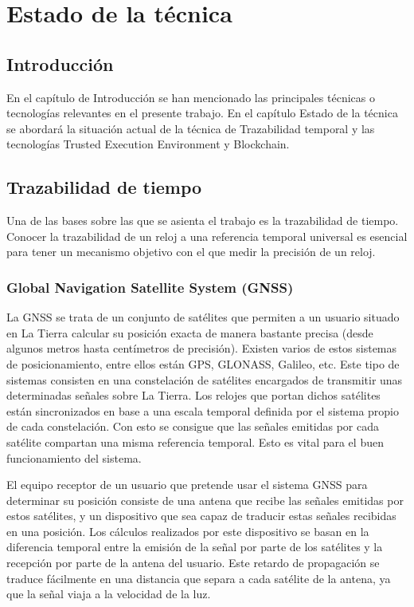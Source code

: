 \chapter{Estado de la técnica}

\section{Introducción}
En el capítulo de Introducción se han mencionado las principales técnicas o tecnologías relevantes en el presente trabajo. En el capítulo Estado de la técnica se abordará la situación actual de la técnica de Trazabilidad temporal y las tecnologías Trusted Execution Environment y Blockchain.

\section{Trazabilidad de tiempo}
Una de las bases sobre las que se asienta el trabajo es la trazabilidad de tiempo. Conocer la trazabilidad de un reloj a una referencia temporal universal es esencial para tener un mecanismo objetivo con el que medir la precisión de un reloj.

\subsection{Global Navigation Satellite System (GNSS)}
La GNSS se trata de un conjunto de satélites que permiten a un usuario situado en La Tierra calcular su posición exacta de manera bastante precisa (desde algunos metros hasta centímetros de precisión). Existen varios de estos sistemas de posicionamiento, entre ellos están GPS, GLONASS, Galileo, etc. Este tipo de sistemas consisten en una constelación de satélites encargados de transmitir unas determinadas señales sobre La Tierra. Los relojes que portan dichos satélites están sincronizados en base a una escala temporal definida por el sistema propio de cada constelación. Con esto se consigue que las señales emitidas por cada satélite compartan una misma referencia temporal. Esto es vital para el buen funcionamiento del sistema. \newline

El equipo receptor de un usuario que pretende usar el sistema GNSS para determinar su posición consiste de una antena que recibe las señales emitidas por estos satélites, y un dispositivo que sea capaz de traducir estas señales recibidas en una posición. Los cálculos realizados por este dispositivo se basan en la diferencia temporal entre la emisión de la señal por parte de los satélites y la recepción por parte de la antena del usuario. Este retardo de propagación se traduce fácilmente en una distancia que separa a cada satélite de la antena, ya que la señal viaja a la velocidad de la luz. \newline

